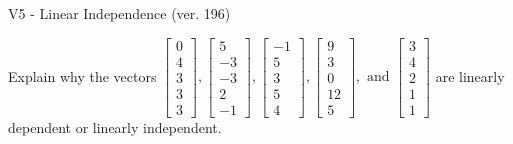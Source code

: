 \begin{exercise}
  \begin{exerciseTitle}V5 - Linear Independence (ver. 196)\end{exerciseTitle}
  \begin{exerciseStatement}
    Explain why the vectors \(\left[\begin{array}{r}
0 \\
4 \\
3 \\
3 \\
3
\end{array}\right] , \left[\begin{array}{r}
5 \\
-3 \\
-3 \\
2 \\
-1
\end{array}\right] , \left[\begin{array}{r}
-1 \\
5 \\
3 \\
5 \\
4
\end{array}\right] , \left[\begin{array}{r}
9 \\
3 \\
0 \\
12 \\
5
\end{array}\right] , \text{ and } \left[\begin{array}{r}
3 \\
4 \\
2 \\
1 \\
1
\end{array}\right]\) are linearly dependent or linearly independent.	



\end{exerciseStatement}
\end{exercise}
